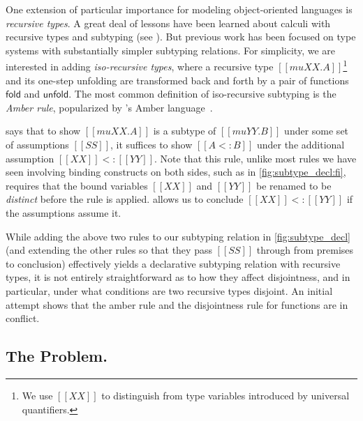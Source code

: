 One extension of particular importance for modeling object-oriented languages is
\textit{recursive types}. A great deal of lessons have been learned about
calculi with recursive types and subtyping (see \citet[chap.
20]{DBLP:books/daglib/0005958}). But previous work has been focused on type
systems with substantially simpler subtyping relations. For simplicity, we are
interested in adding \textit{iso-recursive types}, where a recursive type $[[mu XX . A]]$\footnote{We use $[[XX]]$ to distinguish from type variables introduced by universal quantifiers.} and its one-step unfolding are transformed back and forth by a pair
of functions $\mathsf{fold}$ and $\mathsf{unfold}$. The most common definition
of iso-recursive subtyping is the \textit{Amber rule}, popularized by
\citeauthor{DBLP:conf/litp/Cardelli85}'s Amber language~\citep{DBLP:conf/litp/Cardelli85}.
\begin{mathpar}
\end{mathpar}
 says that to show $[[mu XX . A]] $ is a subtype of $ [[mu YY .
B]]$ under some set of assumptions $[[SS]]$, it suffices to show $[[A <: B]]$
under the additional assumption $[[XX]] <: [[YY]]$. Note that this rule, unlike
most rules we have seen involving binding constructs on both sides, such as
 in \cref{fig:subtype_decl:fi}, requires that the bound variables
$[[XX]]$ and $[[YY]]$ be renamed to be \textit{distinct} before the rule is
applied.  allows us to conclude $[[XX]] <: [[YY]]$ if the
assumptions assume it.

While adding the above two rules to our subtyping relation in
\cref{fig:subtype_decl} (and extending the other rules so that they pass
$[[SS]]$ through from premises to conclusion) effectively yields a declarative
subtyping relation with recursive types, it is not entirely straightforward as
to how they affect disjointness, and in particular, under what conditions are
two recursive types disjoint. An initial attempt shows that the amber rule and
the disjointness rule for functions are in conflict.

\subsection{The Problem.}

